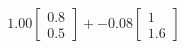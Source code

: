 \documentclass[preview]{standalone}
\begin{document}
\begin{align*}
1.00 \begin{bmatrix} 0.8 \\ 0.5 \end{bmatrix} + -0.08 \begin{bmatrix} 1 \\ 1.6 \end{bmatrix}
\end{align*}
\end{document}
